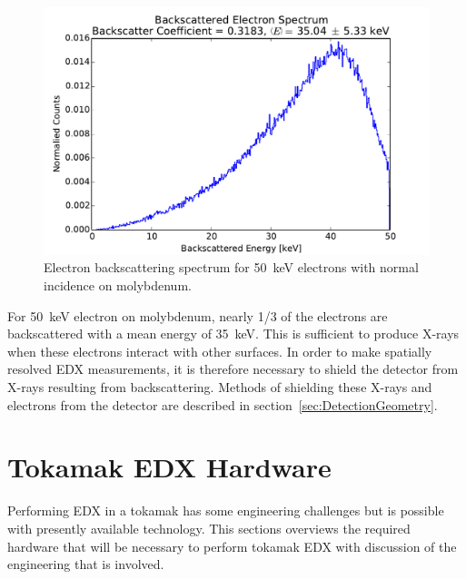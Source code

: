 \documentclass[12pt,letterpaper,final]{article}
\begin{document}
\begin{figure}[!h]
 \centering
  \includegraphics[width=\columnwidth]{figures/MolybdenumBackscatteringSpectrum.pdf}
 \caption{Electron backscattering spectrum for 50~keV electrons with normal incidence on molybdenum.} 
 \label{fig:BackscatteringSpectrum}
\end{figure}

For 50~keV electron on molybdenum, nearly 1/3 of the electrons are backscattered with a mean energy of 35~keV. This is sufficient to produce X-rays when these electrons interact with other surfaces. In order to make spatially resolved EDX measurements, it is therefore necessary to shield the detector from X-rays resulting from backscattering. Methods of shielding these X-rays and electrons from the detector are described in section~\ref{sec:DetectionGeometry}.

\section{Tokamak EDX Hardware}
Performing EDX in a tokamak has some engineering challenges but is possible with presently available technology. This sections overviews the required hardware that will be necessary to perform tokamak EDX with discussion of the engineering that is involved.
\end{document}
